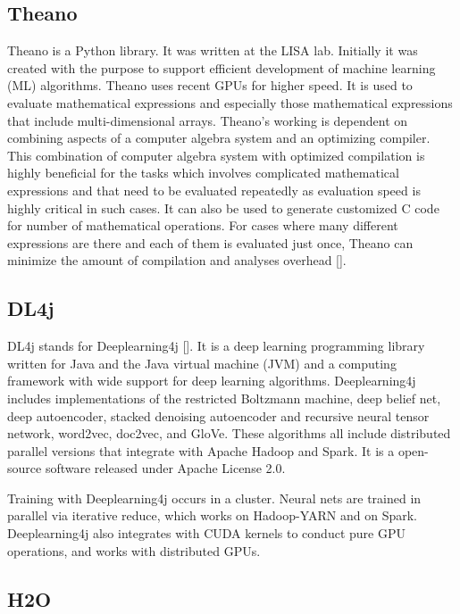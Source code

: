     
\subsection{Theano}
    
Theano is a Python library. It was written at the LISA lab.  Initially
it was created with the purpose to support efficient development of
machine learning (ML) algorithms.  Theano uses recent GPUs for higher
speed.  It is used to evaluate mathematical expressions and especially
those mathematical expressions that include multi-dimensional arrays.
Theano's working is dependent on combining aspects of a computer
algebra system and an optimizing compiler.  This combination of
computer algebra system with optimized compilation is highly
beneficial for the tasks which involves complicated mathematical
expressions and that need to be evaluated repeatedly as evaluation
speed is highly critical in such cases.  It can also be used to
generate customized C code for number of mathematical operations.  For
cases where many different expressions are there and each of them is
evaluated just once, Theano can minimize the amount of compilation and
analyses overhead [\cite{www-theano}].
    
\subsection{DL4j}

DL4j stands for Deeplearning4j [\cite{www-dl4j}]. It is a deep learning
programming library written for Java and the Java virtual machine
(JVM) and a computing framework with wide support for deep learning
algorithms. Deeplearning4j includes implementations of the restricted
Boltzmann machine, deep belief net, deep autoencoder, stacked
denoising autoencoder and recursive neural tensor network, word2vec,
doc2vec, and GloVe. These algorithms all include distributed parallel
versions that integrate with Apache Hadoop and Spark. It is a
open-source software released under Apache License 2.0.

Training with Deeplearning4j occurs in a cluster. Neural nets are
trained in parallel via iterative reduce, which works on Hadoop-YARN
and on Spark. Deeplearning4j also integrates with CUDA kernels to
conduct pure GPU operations, and works with distributed GPUs.
  
\subsection{H2O}

